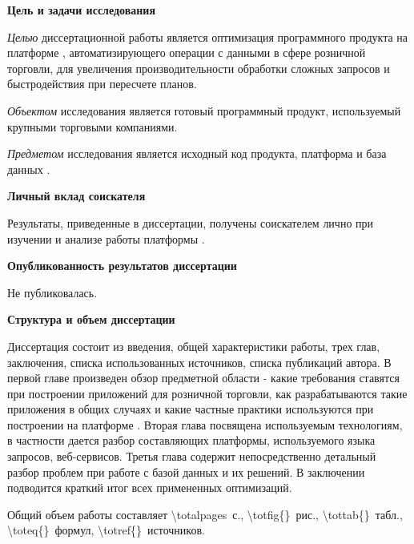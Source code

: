 
\textbf{Цель и задачи исследования}

\emph{Целью} диссертационной работы является  оптимизация программного продукта на платформе \LB, автоматизирующего операции с данными в сфере розничной торговли, для увеличения производительности обработки сложных запросов и быстродействия при пересчете планов.

\emph{Объектом} исследования является готовый программный продукт, используемый крупными торговыми компаниями.

\emph{Предметом} исследования является исходный код продукта, платформа и база данных \LB.



\textbf{Личный вклад соискателя}

Результаты, приведенные в диссертации, получены соискателем лично при изучении и анализе работы платформы \LB.


\textbf{Опубликованность результатов диссертации}

Не публиковалась.

\textbf{Структура и объем диссертации}

Диссертация состоит из введения, общей характеристики работы, трех глав, заключения, списка использованных источников, списка публикаций автора. В первой главе произведен обзор предметной области - какие требования ставятся при построении приложений для розничной торговли, как разрабатываются такие приложения в общих случаях и какие частные практики используются при построении на платформе \LB. Вторая глава посвящена используемым технологиям, в частности дается разбор составляющих платформы, используемого языка запросов, веб-сервисов. Третья глава содержит непосредственно детальный разбор проблем при работе с базой данных и их решений. В заключении подводится краткий итог всех примененных оптимизаций.


Общий объем работы составляет \num{\totalpages}~с., \num{\totfig{}}~рис., \num{\tottab{}}~табл., \num{\toteq{}}~формул, \num{\totref{}}~источников.

